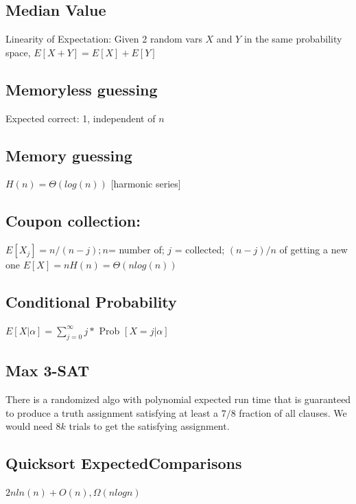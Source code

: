 \subsection{Median Value}
Linearity of Expectation: Given 2 random vars $X$ and $Y$ in the same probability space, $E [X + Y] = E[ X ] + E [ Y ] $

\subsection{Memoryless guessing}
Expected correct: 1, independent of $n$

\subsection{Memory guessing}
$H(n) = \Theta(log(n))$ [harmonic series]

\subsection{Coupon collection:}
$E[ X_{j}] = n / (n - j); n $= number of; $j$ = collected; $( n - j ) / n$ of getting a new one
$E[X] = nH(n) = \Theta(nlog(n))$

\subsection{Conditional Probability}
$E[ X | \alpha ] =  \sum_{j=0}^{\infty} j *$ Prob $[ X = j | \alpha]$

\subsection{Max 3-SAT}
There is a randomized algo with polynomial expected run time that is guaranteed to produce a truth assignment satisfying at least a $7/8$ fraction of all clauses. We would need $8k$ trials to get the satisfying assignment.

\begin{algorithmic}[1]
		\EndFor
		\Else
		\EndIf
	\EndFunction
\end{algorithmic}


\subsection{Quicksort ExpectedComparisons}
$2nln(n) + O(n), \Omega(nlogn)$


